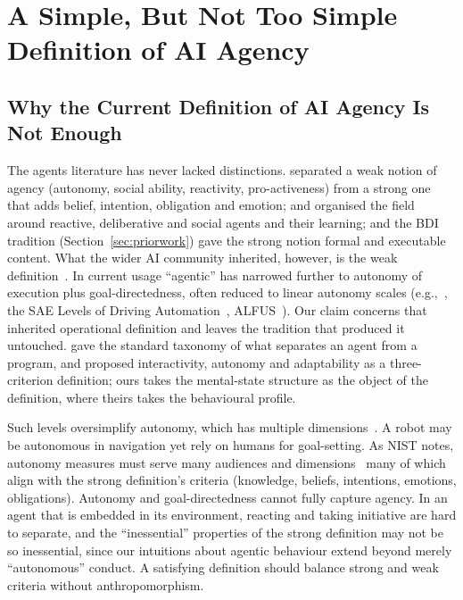 \documentclass[pdflatex,sn-apa]{sn-jnl}%
\theoremstyle{definition}
\begin{document}
\section{A Simple, But Not Too Simple Definition of AI Agency}\label{sec:definition}
\subsection{Why the Current Definition of AI Agency Is Not Enough}

The agents literature has never lacked distinctions. \citet{wooldridgeIntelligentAgentsTheory1995} separated a weak notion of agency (autonomy, social ability, reactivity, pro-activeness) from a strong one that adds belief, intention, obligation and emotion; \citet{stoneMultiagentSurveyML2000} and \citet{jenningsRoadmapAgentResearch1998} organised the field around reactive, deliberative and social agents and their learning; and the BDI tradition (Section~\ref{sec:priorwork}) gave the strong notion formal and executable content. What the wider AI community inherited, however, is the weak definition~\citep{luckConceptualFrameworkAgent2001}. In current usage ``agentic'' has narrowed further to autonomy of execution plus goal-directedness, often reduced to linear autonomy scales (e.g.,~\citep{shavitPracticesGoverningAgentic}, the SAE Levels of Driving Automation~\citep{vyasKeySafetyDesign}, ALFUS~\citep{huangAutonomyMeasuresRobots2008}). Our claim concerns that inherited operational definition and leaves the tradition that produced it untouched. \citet{franklinAgentOrProgram1997} gave the standard taxonomy of what separates an agent from a program, and \citet{floridiMoralityArtificialAgents2004} proposed interactivity, autonomy and adaptability as a three-criterion definition; ours takes the mental-state structure as the object of the definition, where theirs takes the behavioural profile.

Such levels oversimplify autonomy, which has multiple dimensions~\citep{staytonItsTimeRethink2020}. A robot may be autonomous in navigation yet rely on humans for goal-setting. As NIST notes, autonomy measures must serve many audiences and dimensions~\citep{huangFrameworkAutonomyLevels2005} many of which align with the strong definition's criteria (knowledge, beliefs, intentions, emotions, obligations). Autonomy and goal-directedness cannot fully capture agency. In an agent that is embedded in its environment, reacting and taking initiative are hard to separate, and the ``inessential'' properties of the strong definition may not be so inessential, since our intuitions about agentic behaviour extend beyond merely ``autonomous'' conduct. A satisfying definition should balance strong and weak criteria without anthropomorphism.
\end{document}
